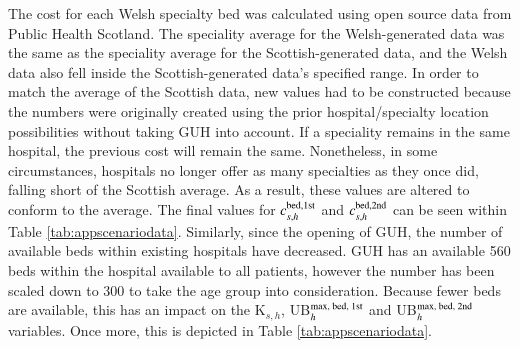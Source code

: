 \documentclass[../thesis.tex]{subfiles}
\begin{document}

The cost for each Welsh specialty bed was calculated using open source data from Public Health Scotland. The speciality average for the Welsh-generated data was the same as the speciality average for the Scottish-generated data, and the Welsh data also fell inside the Scottish-generated data's specified range. In order to match the average of the Scottish data, new values had to be constructed because the numbers were originally created using the prior hospital/specialty location possibilities without taking GUH into account. If a speciality remains in the same hospital, the previous cost will remain the same. Nonetheless, in some circumstances, hospitals no longer offer as many specialties as they once did, falling short of the Scottish average. As a result, these values are altered to conform to the average. The final values for $c^\textnormal{bed,1st}_{s,h}$ and $c^\textnormal{bed,2nd}_{s,h}$ can be seen within Table \ref{tab:appscenariodata}. Similarly, since the opening of GUH, the number of available beds within existing hospitals have decreased. GUH has an available 560 beds within the hospital available to all patients, however the number has been scaled down to 300 to take the age group into consideration. Because fewer beds are available, this has an impact on the K$_{s,h}$, UB$^\textnormal{max, bed, 1st}_{h}$ and UB$^\textnormal{max, bed, 2nd}_{h}$ variables. Once more, this is depicted in Table \ref{tab:appscenariodata}.
\end{document}
